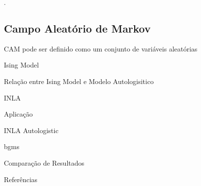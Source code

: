 \documentclass[
  super,
  preprint,
  3p]{elsarticle}
\begin{document}
\citet{Marsman2023}

\citep{Huth, Marsman2023}.

\subsection{Campo Aleatório de
Markov}\label{campo-aleatuxf3rio-de-markov}

CAM pode ser definido como um conjunto de variáveis aleatórias

Ising Model

Relação entre Ising Model e Modelo Autologisitico

INLA

Aplicação

INLA Autologistic

bgms

Comparação de Resultados

Referências


  
\end{document}
